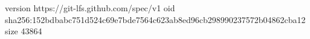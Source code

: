 version https://git-lfs.github.com/spec/v1
oid sha256:152bdbabc751d524c69e7bde7564c623ab8ed96cb298990237572b04862cba12
size 43864
